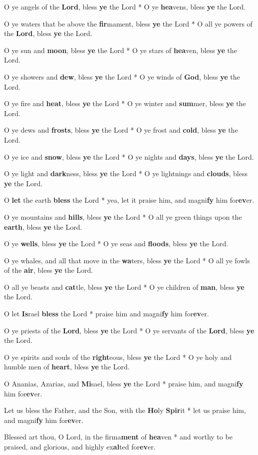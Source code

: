 \begin{multicols}{2}
	O ye angels of the \textbf{Lord}, bless \textbf{ye} the Lord * O ye \textbf{hea}vens, bless \textbf{ye} the Lord.
	
	O ye waters that be above the \textbf{fir}mament, bless \textbf{ye} the Lord * O all ye powers of the \textbf{Lord}, bless \textbf{ye} the Lord.
	
	O ye sun and \textbf{moon}, bless \textbf{ye} the Lord * O ye stars of \textbf{hea}ven, bless \textbf{ye} the Lord.
	
	O ye showers and \textbf{dew}, bless \textbf{ye} the Lord * O ye winds of \textbf{God}, bless \textbf{ye} the Lord.
	
	O ye fire and \textbf{heat}, bless \textbf{ye} the Lord * O ye winter and \textbf{sum}mer, bless \textbf{ye} the Lord.
	
	O ye dews and \textbf{frosts}, bless \textbf{ye} the Lord * O ye frost and \textbf{cold}, bless \textbf{ye} the Lord.
	
	O ye ice and \textbf{snow}, bless \textbf{ye} the Lord * O ye nights and \textbf{days}, bless \textbf{ye} the Lord.
	
	O ye light and \textbf{dark}ness, bless \textbf{ye} the Lord * O ye lightnings and \textbf{clouds}, bless \textbf{ye} the Lord.
	
	O \textbf{let} the earth \textbf{bless} the Lord * yea, let it praise him, and magni\textbf{fy} him for\textbf{ev}er.
	
	O ye mountains and \textbf{hills}, bless \textbf{ye} the Lord * O all ye green things upon the \textbf{earth}, bless \textbf{ye} the Lord.
	
	O ye \textbf{wells}, bless \textbf{ye} the Lord * O ye seas and \textbf{floods}, bless \textbf{ye} the Lord.
	
	O ye whales, and all that move in the \textbf{wa}ters, bless \textbf{ye} the Lord * O all ye fowls of the \textbf{air}, bless \textbf{ye} the Lord.
	
	O all ye beasts and \textbf{cat}tle, bless \textbf{ye} the Lord * O ye children of \textbf{man}, bless \textbf{ye} the Lord.
	
	O let \textbf{Is}rael \textbf{bless} the Lord * praise him and magni\textbf{fy} him for\textbf{ev}er.
	
	O ye priests of the \textbf{Lord}, bless \textbf{ye} the Lord * O ye servants of the \textbf{Lord}, bless \textbf{ye} the Lord.
	
	O ye spirits and souls of the \textbf{right}eous, bless \textbf{ye} the Lord * O ye holy and humble men of \textbf{heart}, bless \textbf{ye} the Lord.
	
	O Ananias, Azarias, and \textbf{Mi}sael, bless \textbf{ye} the Lord * praise him, and magni\textbf{fy} him for\textbf{ev}er.
	
	Let us bless the Father, and the Son, with the \textbf{Ho}ly \textbf{Spir}it * let us praise him, and magni\textbf{fy} him for\textbf{ev}er.
	
	Blessed art thou, O Lord, in the firma\textbf{ment} of \textbf{hea}ven * and worthy to be praised, and glorious, and highly ex\textbf{al}ted for\textbf{ev}er.
\end{multicols}